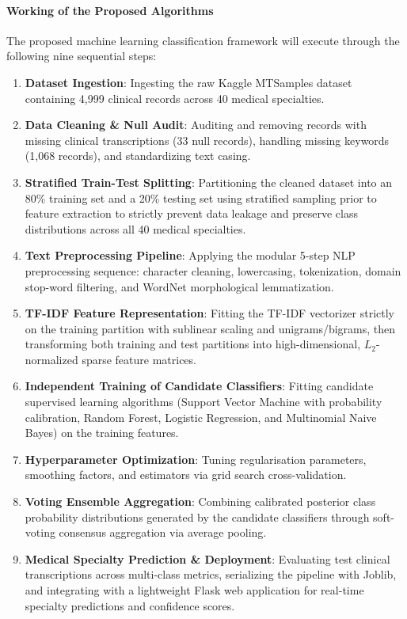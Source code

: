 \paragraph{Working of the Proposed Algorithms}
The proposed machine learning classification framework will execute through the following nine sequential steps:
\begin{enumerate}
    \item \textbf{Dataset Ingestion}: Ingesting the raw Kaggle MTSamples dataset containing 4,999 clinical records across 40 medical specialties.
    \item \textbf{Data Cleaning \& Null Audit}: Auditing and removing records with missing clinical transcriptions (33 null records), handling missing keywords (1,068 records), and standardizing text casing.
    \item \textbf{Stratified Train-Test Splitting}: Partitioning the cleaned dataset into an 80\% training set and a 20\% testing set using stratified sampling prior to feature extraction to strictly prevent data leakage and preserve class distributions across all 40 medical specialties.
    \item \textbf{Text Preprocessing Pipeline}: Applying the modular 5-step NLP preprocessing sequence: character cleaning, lowercasing, tokenization, domain stop-word filtering, and WordNet morphological lemmatization.
    \item \textbf{TF-IDF Feature Representation}: Fitting the TF-IDF vectorizer strictly on the training partition with sublinear scaling and unigrams/bigrams, then transforming both training and test partitions into high-dimensional, $L_2$-normalized sparse feature matrices.
    \item \textbf{Independent Training of Candidate Classifiers}: Fitting candidate supervised learning algorithms (Support Vector Machine with probability calibration, Random Forest, Logistic Regression, and Multinomial Naive Bayes) on the training features.
    \item \textbf{Hyperparameter Optimization}: Tuning regularisation parameters, smoothing factors, and estimators via grid search cross-validation.
    \item \textbf{Voting Ensemble Aggregation}: Combining calibrated posterior class probability distributions generated by the candidate classifiers through soft-voting consensus aggregation via average pooling.
    \item \textbf{Medical Specialty Prediction \& Deployment}: Evaluating test clinical transcriptions across multi-class metrics, serializing the pipeline with Joblib, and integrating with a lightweight Flask web application for real-time specialty predictions and confidence scores.
\end{enumerate}

